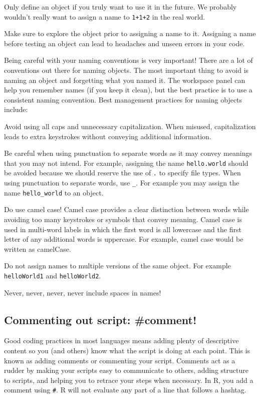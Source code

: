 \documentclass[]{article}
\begin{document}
Only define an object if you truly want to use it in the future. We
probably wouldn't really want to assign a name to \texttt{1+1+2} in the
real world.

Make sure to explore the object prior to assigning a name to it.
Assigning a name before testing an object can lead to headaches and
unseen errors in your code.

 Being careful with your naming conventions is very important! There are
a lot of conventions out there for naming objects. The most important
thing to avoid is naming an object and forgetting what you named it. The
workspace panel can help you remember names (if you keep it clean), but
the best practice is to use a consistent naming convention. Best
management practices for naming objects include:

Avoid using all caps and unnecessary capitalization. When misused,
capitalization leads to extra keystrokes without conveying additional
information.

Be careful when using punctuation to separate words as it may convey
meanings that you may not intend. For example, assigning the name
\texttt{hello.world} should be avoided because we should reserve the use
of \texttt{.} to specify file types. When using punctuation to separate
words, use \texttt{\_}. For example you may assign the name
\texttt{hello\_world} to an object.

Do use camel case! Camel case provides a clear distinction between words
while avoiding too many keystrokes or symbols that convey meaning. Camel
case is used in multi-word labels in which the first word is all
lowercase and the first letter of any additional words is uppercase. For
example, camel case would be written as camelCase.

Do not assign names to multiple versions of the same object. For example
\texttt{helloWorld1} and \texttt{helloWorld2}.

Never, never, never, never include spaces in names!

\subsection{Commenting out script:
\#comment!}\label{commenting-out-script-comment}

Good coding practices in most languages means adding plenty of
descriptive content so you (and others) know what the script is doing at
each point. This is known as adding comments or commenting your script.
Comments act as a rudder by making your scripts easy to communicate to
others, adding structure to scripts, and helping you to retrace your
steps when necessary. In R, you add a comment using \texttt{\#}. R will
not evaluate any part of a line that follows a hashtag.
\end{document}
